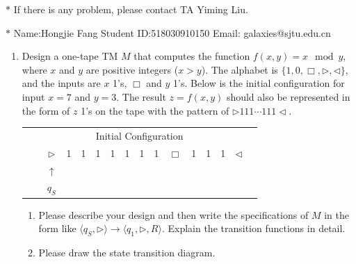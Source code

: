 \documentclass[12pt,a4paper]{article}
\theoremstyle{definition}
\begin{document}
\noindent

\noindent{}
\begin{center}
\footnotesize{\color{red}$*$ If there is any problem, please contact TA Yiming Liu. }

\footnotesize{\color{blue}$*$ Name:Hongjie Fang  \quad Student ID:518030910150 \quad Email: galaxies@sjtu.edu.cn}
\end{center}

\begin{enumerate}

\item
Design a one-tape TM $M$ that computes the function $f(x, y) = x \mod y$, where $x$ and $y$ are positive integers ($x > y$). The alphabet is $\{1, 0, \Box, \triangleright, \triangleleft\}$, and the inputs are $x$ 1's, $\Box$ and $y$ 1's. Below is the initial configuration for input $x=7$ and $y=3$. The result $z=f(x, y)$ should also be represented in the form of $z$ 1's on the tape with the pattern of $\triangleright 111 \cdots 111 \triangleleft$.
\begin{center}
	\begin{tabular}{ll|c|c|c|c|c|c|c|c|c|c|c|c|c|c}
		& \multicolumn{14}{c}{Initial Configuration}\\[5pt]
		\cline{2-16}
		& & $\triangleright$ &  1  & 1 & 1 & 1 & 1 & 1 & 1 & $\Box$ & 1 & 1 & 1 & $ \triangleleft$ & \\
		\cline{2-16}
		\multicolumn{2}{c}{} & \multicolumn{1}{c}{$\uparrow$} & \multicolumn{11}{c}{}\\[-4px]
		\multicolumn{2}{c}{} & \multicolumn{1}{c}{$q_S$} & \multicolumn{11}{c}{}	
	\end{tabular}
\end{center}

\begin{enumerate}
	\item
	Please describe your design and then write the specifications of $M$ in the form like $\langle q_S, \triangleright \rangle \rightarrow \langle q_1, \triangleright,  R\rangle$. Explain the transition functions in detail.
	
	\item
	Please draw the state transition diagram.
	

\end{enumerate}
\end{enumerate}
\end{document}
